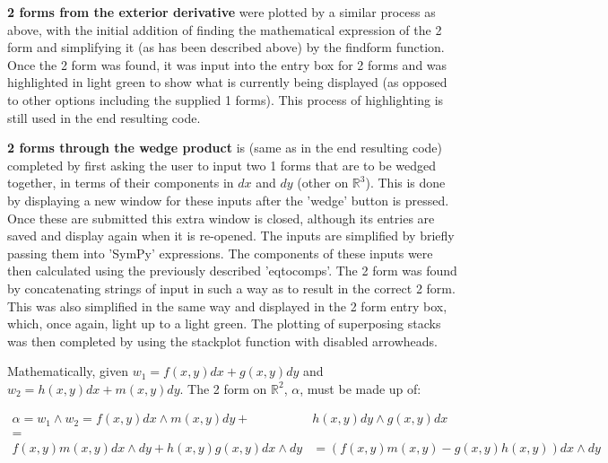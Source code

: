 \documentclass[11]{report}
\begin{document}
\textbf{2 forms from the exterior derivative} were plotted by a similar process as above, with the initial addition of finding the mathematical expression of the 2 form and simplifying it (as has been described above) by the find\textunderscore form function. Once the 2 form was found, it was input into the entry box for 2 forms and was highlighted in light green to show what is currently being displayed (as opposed to other options including the supplied 1 forms). This process of highlighting is still used in the end resulting code. 


\textbf{2 forms through the wedge product} is (same as in the end resulting code) completed by first asking the user to input two 1 forms that are to be wedged together, in terms of their components in $dx$ and $dy$ (other on $\mathbb{R}^{3}$). This is done by displaying a new window for these inputs after the 'wedge' button is pressed. Once these are submitted this extra window is closed, although its entries are saved and display again when it is re-opened. The inputs are simplified by briefly passing them into 'SymPy' expressions. The components of these inputs were then calculated using the previously described 'eq\textunderscore to\textunderscore comps'. The 2 form was found by concatenating strings of input in such a way as to result in the correct 2 form. This was also simplified in the same way and displayed in the 2 form entry box, which, once again, light up to a light green. The plotting of superposing stacks was then completed by using the stack\textunderscore plot function with disabled arrowheads.

Mathematically, given $w_{1} = f(x, y) dx + g(x, y) dy$  and $w_{2} = h(x, y) dx + m(x, y) dy$. The 2 form on $\mathbb{R}^{2}$, $\alpha$, must be made up of:


\begin{equation}
	\label{T2} \begin{split}
		\alpha = w_{1}\wedge w_{2} = f(x, y) dx\wedge m(x, y) dy + &h(x, y) dy\wedge g(x, y) dx \\
		= \\
		f(x, y)m(x, y) dx\wedge dy + h(x, y)g(x, y) dx\wedge dy &= (f(x, y)m(x, y) - g(x, y)h(x, y)) dx\wedge dy  
	\end{split}
\end{equation}
\end{document}
